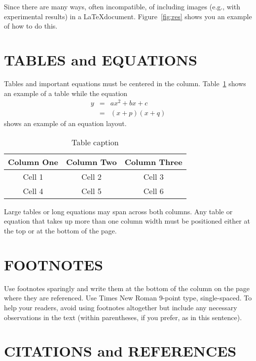 \documentclass{article}
\begin{document}
Since there are many ways, often incompatible, of including images
(e.g., with experimental results) in a \LaTeX document.
Figure~\ref{fig:res} shows you an example of how to do this.


\section{TABLES and EQUATIONS}
\label{sec:tabEqn}

Tables and important equations must be centered in the column.
Table~\ref{tab:cap} shows an example of a table while the equation
\begin{eqnarray}
y &=& ax^2+bx+c
\nonumber
\\
~ &=& (x+p)(x+q)
\end{eqnarray}
shows an example of an equation layout.

\begin{table}[t]
\begin{center}
\caption{Table caption} \label{tab:cap}
\begin{tabular}{|c|c|c|}
  \hline
  Column One & Column Two & Column Three
  \\
  \hline
  Cell 1 & Cell 2 & Cell 3 \\
  Cell 4 & Cell 5 & Cell 6 \\
  \hline
\end{tabular}
\end{center}
\end{table}

Large tables or long equations may span across both columns. Any
table or equation that takes up more than one column width must be
positioned either at the top or at the bottom of the page.



\section{FOOTNOTES}
\label{sec:foot}

Use footnotes sparingly and write them at the bottom of the column
on the page where they are referenced. Use Times New Roman 9-point
type, single-spaced. To help your readers, avoid using footnotes
altogether but include any necessary observations in the text
(within parentheses, if you prefer, as in this sentence).



\section{CITATIONS and REFERENCES}
\label{sec:review}
\end{document}
